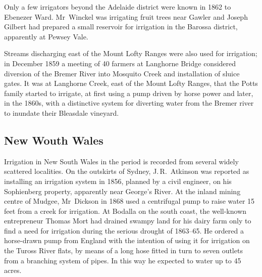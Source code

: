 Only a few irrigators beyond the Adelaide district were known in 1862
to Ebenezer Ward.   Mr~Winckel was irrigating fruit
trees near Gawler and Joseph Gilbert  had prepared
a small reservoir for irrigation in the Barossa 
district, apparently at Pewsey
Vale.

Streams discharging east of the Mount Lofty Ranges were also used for
irrigation; in December 1859 a meeting of 40 farmers at Langhorne
Bridge considered diversion of the Bremer River 
into Mosquito Creek  and installation of sluice
gates.  It was at Langhorne Creek,
 east of the
Mount Lofty Ranges, that the Potts family started to irrigate, at
first using a pump driven by horse power and later, in the 1860s, with
a distinctive system for diverting water from the Bremer river to
inundate their Bleasdale  vineyard.

\subsection*{New Wouth Wales}

Irrigation in New South Wales in the period is recorded from several
widely scattered localities.  On the outskirts of
Sydney, J.\,R.~Atkinson  was
reported as installing an irrigation system in 1856, planned by a
civil engineer, on his Sophienberg property, apparently near George's
River.   At the inland mining centre of Mudgee,
 Mr~Dickson in 1868 used a centrifugal pump
 to raise
water 15\,feet from a creek for irrigation.  At Bodalla
on the south coast, the well-known entrepreneur Thomas Mort
 had
drained swampy land for his dairy farm only to find a need for
irrigation during the serious drought of 1863--65.  He ordered a
horse-drawn pump  from England with the
intention of using it for irrigation on the Tuross River
 flats, by
means of a long hose fitted in turn to seven outlets from a branching
system of pipes.  In this way he expected to water up to 45\,acres.

